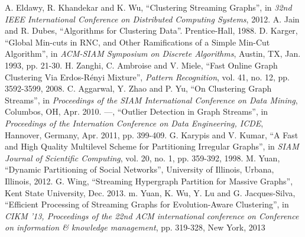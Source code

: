 \documentclass[a4paper,11pt]{article}
\begin{document}
\begin{thebibliography}{99}
 A. Eldawy, R. Khandekar and K. Wu, ``Clustering Streaming Graphs'', in \textit{32nd IEEE International Conference on Distributed Computing Systems}, 2012.
 A. Jain and R. Dubes, ``Algorithms for Clustering Data''. Prentice-Hall, 1988.
 D. Karger, ``Global Min-cuts in RNC, and Other Ramifications of a Simple Min-Cut Algorithm'', in \textit{ACM-SIAM Symposium on Discrete Algorithms}, Austin, TX, Jan. 1993, pp. 21-30.
 H. Zanghi, C. Ambroise and V. Miele, ``Fast Online Graph Clustering Via Erdos-Rényi Mixture'', \textit{Pattern Recognition}, vol. 41, no. 12, pp. 3592-3599, 2008.
 C. Aggarwal, Y. Zhao and P. Yu, ``On Clustering Graph Streams'', in \textit{Proceedings of the SIAM International Conference on Data Mining}, Columbos, OH, Apr. 2010.
 ---,  ``Outlier Detection in Graph Streams'', in \textit{Proceedings of the Internation Conference on Data Engineering, ICDE}, Hannover, Germany, Apr. 2011, pp. 399-409.
 G. Karypis and V. Kumar, ``A Fast and High Quality Multilevel Scheme for Partitioning Irregular Graphs'', in \textit{SIAM Journal of Scientific Computing}, vol. 20, no. 1, pp. 359-392, 1998.
 M. Yuan, ``Dynamic Partitioning of Social Networks'', University of Illinois, Urbana, Illinois, 2012.
 G. Wing, ``Streaming Hypergraph Partition for Massive Graphs'', Kent State University, Dec. 2013.
 m. Yuan, K. Wu, Y. Lu and G. Jacques-Silva, ``Efficient Processing of Streaming Graphs for Evolution-Aware Clustering'', in \textit{CIKM '13, Proceedings of the 22nd ACM international conference on Conference on information \& knowledge management}, pp. 319-328, New York, 2013
\end{thebibliography}
\end{document}
